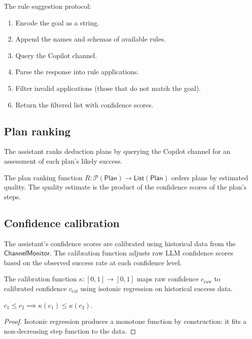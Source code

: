 \documentclass[11pt]{article}
\newcommand{\ChanMon}{\mathsf{ChannelMonitor}}
\begin{document}
\begin{definition}\label{def:rulesuggprot}
The rule suggestion protocol:
\begin{enumerate}
\item Encode the goal as a string.
\item Append the names and schemas of available rules.
\item Query the Copilot channel.
\item Parse the response into rule applications.
\item Filter invalid applications (those that do not match
      the goal).
\item Return the filtered list with confidence scores.
\end{enumerate}
\end{definition}

\subsection{Plan ranking}

The assistant ranks deduction plans by querying the Copilot
channel for an assessment of each plan's likely success.

\begin{definition}\label{def:planrank}
The plan ranking function
$R \colon \mathcal{P}(\mathsf{Plan}) \to \mathsf{List}(\mathsf{Plan})$
orders plans by estimated quality.  The quality estimate
is the product of the confidence scores of the plan's steps.
\end{definition}

\subsection{Confidence calibration}

The assistant's confidence scores are calibrated using
historical data from the $\ChanMon$.  The calibration
function adjusts raw LLM confidence scores based on the
observed success rate at each confidence level.

\begin{definition}\label{def:calibfunc}
The calibration function
$\kappa \colon [0,1] \to [0,1]$
maps raw confidence $c_{\mathrm{raw}}$ to calibrated
confidence $c_{\mathrm{cal}}$ using isotonic regression
on historical success data.
\end{definition}

\begin{lemma}\label{lem:calibmono}
$c_1 \leq c_2 \implies \kappa(c_1) \leq \kappa(c_2)$.
\end{lemma}
\begin{proof}
Isotonic regression produces a monotone function by
construction: it fits a non-decreasing step function to
the data.
\end{proof}
\end{document}
